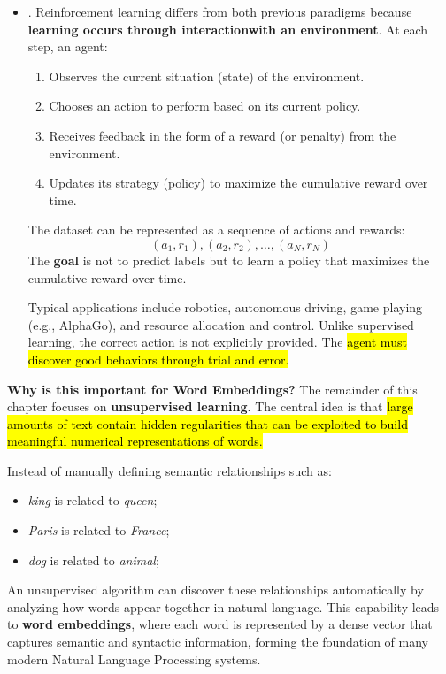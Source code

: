 \begin{itemize}
    
    \item {}. Reinforcement learning differs from both previous paradigms because \textbf{learning occurs through interaction\break with an environment}. At each step, an agent:
    \begin{enumerate}
        \item Observes the current situation (state) of the environment.
        \item Chooses an action to perform based on its current policy.
        \item Receives feedback in the form of a reward (or penalty) from the environment.
        \item Updates its strategy (policy) to maximize the cumulative reward over time.
    \end{enumerate}
    The dataset can be represented as a sequence of actions and rewards:
    \begin{equation*}
        \left(a_1, r_1\right), \left(a_2, r_2\right), \ldots, \left(a_N, r_N\right)
    \end{equation*}
    The \textbf{goal} is not to predict labels but to learn a policy that maximizes the cumulative reward over time.

    \highspace
    Typical applications include robotics, autonomous driving, game playing (e.g., AlphaGo), and resource allocation and control. Unlike supervised learning, the correct action is not explicitly provided. The \hl{agent must discover good behaviors through trial and error.}
\end{itemize}

\newpage

\noindent
\textcolor{Green3}{ \textbf{Why is this important for Word Embeddings?}} The remainder of this chapter focuses on \textbf{unsupervised learning}. The central idea is that \hl{large amounts of text contain hidden regularities that can be exploited to build meaningful numerical representations of words.}

\highspace
Instead of manually defining semantic relationships such as:
\begin{itemize}
    \item \emph{king} is related to \emph{queen};
    \item \emph{Paris} is related to \emph{France};
    \item \emph{dog} is related to \emph{animal};
\end{itemize}
An unsupervised algorithm can discover these relationships automatically by analyzing how words appear together in natural language. This capability leads to \textbf{word embeddings}, where each word is represented by a dense vector that captures semantic and syntactic information, forming the foundation of many modern Natural Language Processing systems.